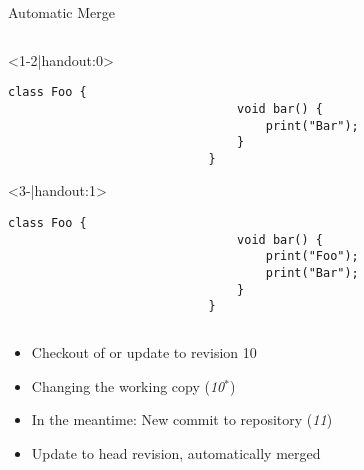 \begin{frame}[fragile]{Automatic Merge}
\begin{columns}[onlytextwidth]
\begin{column}{0.6\linewidth}
\begin{columns}[T]
\begin{column}{0.5\linewidth}
					\begin{onlyenv}
						\begin{lstlisting}[style=java,basicstyle=\fontfamily{pcr}\small\selectfont,numbers=none,escapechar=|]
							class Foo {
								void bar() {
									print("Bar");
								}
							}
						\end{lstlisting}
					\end{onlyenv}
					\begin{onlyenv}
						\begin{lstlisting}[style=java,basicstyle=\fontfamily{pcr}\small\selectfont,numbers=none,escapechar=|]
							class Foo {
								void bar() {
									print("Foo");
									print("Bar");
								}
							}
						\end{lstlisting}
					\end{onlyenv}
				\end{column}
			\end{columns}
			
			\begin{example}{}
				\begin{itemize}
					\item<1-> Checkout of or update to revision 10
					\item<2-> Changing the working copy (\emph{10$^*$})
					\item<3-> In the meantime: New commit to repository (\emph{11})
					\item<4-> Update to head revision, automatically merged
				\end{itemize}			
			\end{example}
		\end{column}
		\begin{column}{0.5\linewidth}
		\end{column}
	\end{columns}
\end{frame}

